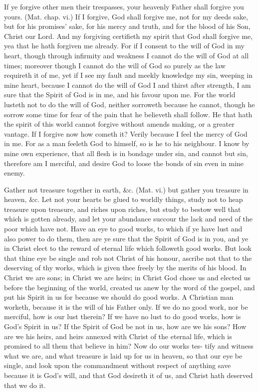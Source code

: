 \documentclass{custom}
\begin{document}
If ye forgive other men their trespasses, your heavenly 
Father shall forgive you yours. (Mat. chap. vi.) If I 
forgive, God shall forgive me, not for my deeds sake, but 
for his promises' sake, for his mercy and truth, and for the 
blood of his Son, Christ our Lord. And my forgiving
certifieth my spirit that God shall forgive me, yea that he
hath forgiven me already. For if I consent to the will of
God in my heart, though through infirmity and weakness 
I cannot do the will of God at all times; moreover though 
I cannot do the will of God so purely as the law requireth 
it of me, yet if I see my fault and meekly knowledge my 
sin, weeping in mine heart, because I cannot do the will of 
God I and thirst after strength, I am sure that the Spirit of 
God is in me, and his favour upon me. For the world 
lusteth not to do the will of God, neither sorroweth because 
he cannot, though he sorrow some time for fear of the pain 
that he believeth shall follow. He that hath the spirit of 
this world cannot forgive without amends making, or a 
greater vantage. If I forgive now how cometh it? Verily 
because I feel the mercy of God in me. For as a man 
feeleth God to himself, so is he to his neighbour. I know 
by mine own experience, that all flesh is in bondage under 
sin, and cannot but sin, therefore am I merciful, and desire 
God to loose the bonds of sin even in mine enemy. 


Gather not treasure together in earth, \&c. (Mat. vi.)
but gather you treasure in heaven, \&c. Let not your 
hearts be glued to worldly things, study not to heap treasure 
upon treasure, and riches upon riches, but study to bestow 
well that which is gotten already, and let your abundance 
succour the lack and need of the poor which have not. 
Have an eye to good works, to which if ye have lust 
and also power to do them, then are ye sure that the Spirit 
of God is in you, and ye in Christ elect to the reward of 
eternal life which followeth good works. But look that 
thine eye be single and rob not Christ of his honour, 
ascribe not that to the deserving of thy works, which is 
given thee freely by the merits of his blood. In Christ we 
are sons; in Christ we are heirs; in Christ God chose us 
and elected us before the beginning of the world, created 
us anew by the word of the gospel, and put his Spirit in 
us for because we should do good works. A Christian 
man worketh, because it is the will of his Father only. 
If we do no good work, nor be merciful, how is our lust 
therein? If we have no lust to do good works, how is 
God's Spirit in us? If the Spirit of God be not in us, 
how are we his sons? How are we his heirs, and heirs 
annexed with Christ of the eternal life, which is promised 
to all them that believe in him? Now do our works tes- 
tify and witness what we are, and what treasure is laid up 
for us in heaven, so that our eye be single, and look upon 
the commandment without respect of anything save because 
it is God's will, and that God desireth it of us, and Christ 
hath deserved that we do it. 
\end{document}
